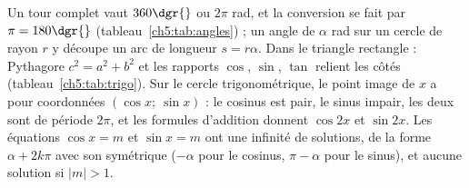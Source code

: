 \begin{aretirer}
Un tour complet vaut $360\dgr{}$ ou $2\pi$ rad, et la conversion se fait par $\pi = 180\dgr{}$ (tableau~\ref{ch5:tab:angles}) ; un angle de $\alpha$ rad sur un cercle de rayon $r$ y découpe un arc de longueur $s = r\alpha$. Dans le triangle rectangle : Pythagore $c^{2} = a^{2} + b^{2}$ et les rapports $\cos$, $\sin$, $\tan$ relient les côtés (tableau~\ref{ch5:tab:trigo}). Sur le cercle trigonométrique, le point image de $x$ a pour coordonnées $(\cos x;\ \sin x)$ : le cosinus est pair, le sinus impair, les deux sont de période $2\pi$, et les formules d'addition donnent $\cos 2x$ et $\sin 2x$. Les équations $\cos x = m$ et $\sin x = m$ ont une infinité de solutions, de la forme $\alpha + 2k\pi$ avec son symétrique ($-\alpha$ pour le cosinus, $\pi - \alpha$ pour le sinus), et aucune solution si $|m| > 1$.
\end{aretirer}
